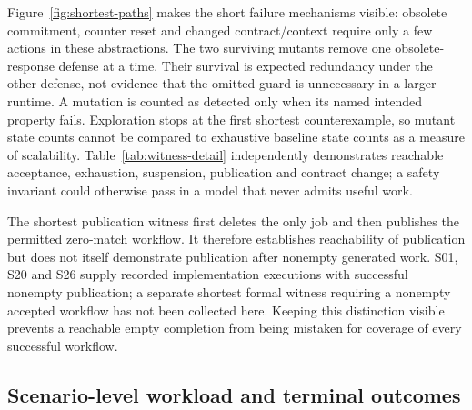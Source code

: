 \documentclass[pdflatex,sn-mathphys-num]{sn-jnl}
\theoremstyle{thmstyleone}
\theoremstyle{thmstylethree}
\theoremstyle{thmstyletwo}
\begin{document}
Figure~\ref{fig:shortest-paths} makes the short failure mechanisms visible: obsolete commitment, counter reset and changed contract/context require only a few actions in these abstractions. The two surviving mutants remove one obsolete-response defense at a time. Their survival is expected redundancy under the other defense, not evidence that the omitted guard is unnecessary in a larger runtime. A mutation is counted as detected only when its named intended property fails. Exploration stops at the first shortest counterexample, so mutant state counts cannot be compared to exhaustive baseline state counts as a measure of scalability. Table~\ref{tab:witness-detail} independently demonstrates reachable acceptance, exhaustion, suspension, publication and contract change; a safety invariant could otherwise pass in a model that never admits useful work.

The shortest publication witness first deletes the only job and then publishes the permitted zero-match workflow. It therefore establishes reachability of publication but does not itself demonstrate publication after nonempty generated work. S01, S20 and S26 supply recorded implementation executions with successful nonempty publication; a separate shortest formal witness requiring a nonempty accepted workflow has not been collected here. Keeping this distinction visible prevents a reachable empty completion from being mistaken for coverage of every successful workflow.

\subsection{Scenario-level workload and terminal outcomes}
\end{document}
